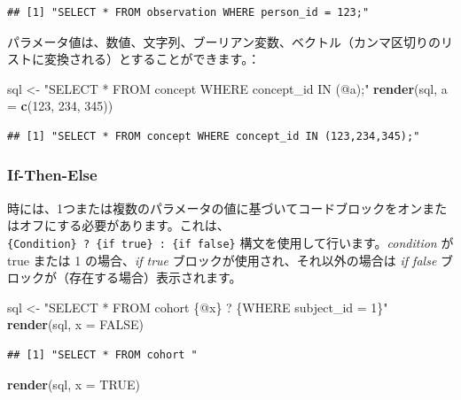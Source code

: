 \documentclass[
  11pt]{book}
\newenvironment{Shaded}{\begin{snugshade}}{\end{snugshade}}
\newcommand{\AttributeTok}[1]{\textcolor[rgb]{0.13,0.29,0.53}{#1}}
\newcommand{\ConstantTok}[1]{\textcolor[rgb]{0.56,0.35,0.01}{#1}}
\newcommand{\DecValTok}[1]{\textcolor[rgb]{0.00,0.00,0.81}{#1}}
\newcommand{\FunctionTok}[1]{\textcolor[rgb]{0.13,0.29,0.53}{\textbf{#1}}}
\newcommand{\NormalTok}[1]{#1}
\newcommand{\OtherTok}[1]{\textcolor[rgb]{0.56,0.35,0.01}{#1}}
\newcommand{\StringTok}[1]{\textcolor[rgb]{0.31,0.60,0.02}{#1}}
\theoremstyle{definition}
\theoremstyle{definition}
\theoremstyle{definition}
\theoremstyle{definition}
\theoremstyle{remark}
\begin{document}
\begin{verbatim}
## [1] "SELECT * FROM observation WHERE person_id = 123;"
\end{verbatim}

パラメータ値は、数値、文字列、ブーリアン変数、ベクトル（カンマ区切りのリストに変換される）とすることができます。：

\begin{Shaded}
\begin{Highlighting}[]
\NormalTok{sql }\OtherTok{\textless{}{-}} \StringTok{"SELECT * FROM concept WHERE concept\_id IN (@a);"}
\FunctionTok{render}\NormalTok{(sql, }\AttributeTok{a =} \FunctionTok{c}\NormalTok{(}\DecValTok{123}\NormalTok{, }\DecValTok{234}\NormalTok{, }\DecValTok{345}\NormalTok{))}
\end{Highlighting}
\end{Shaded}

\begin{verbatim}
## [1] "SELECT * FROM concept WHERE concept_id IN (123,234,345);"
\end{verbatim}

\subsubsection*{If-Then-Else}\label{if-then-else}

時には、1つまたは複数のパラメータの値に基づいてコードブロックをオンまたはオフにする必要があります。これは、\texttt{\{Condition\}\ ?\ \{if\ true\}\ :\ \{if\ false\}} 構文を使用して行います。\emph{condition} が true または 1 の場合、\emph{if true} ブロックが使用され、それ以外の場合は \emph{if false} ブロックが（存在する場合）表示されます。

\begin{Shaded}
\begin{Highlighting}[]
\NormalTok{sql }\OtherTok{\textless{}{-}} \StringTok{"SELECT * FROM cohort \{@x\} ? \{WHERE subject\_id = 1\}"}
\FunctionTok{render}\NormalTok{(sql, }\AttributeTok{x =} \ConstantTok{FALSE}\NormalTok{)}
\end{Highlighting}
\end{Shaded}

\begin{verbatim}
## [1] "SELECT * FROM cohort "
\end{verbatim}

\begin{Shaded}
\begin{Highlighting}[]
\FunctionTok{render}\NormalTok{(sql, }\AttributeTok{x =} \ConstantTok{TRUE}\NormalTok{)}
\end{Highlighting}
\end{Shaded}
\end{document}
